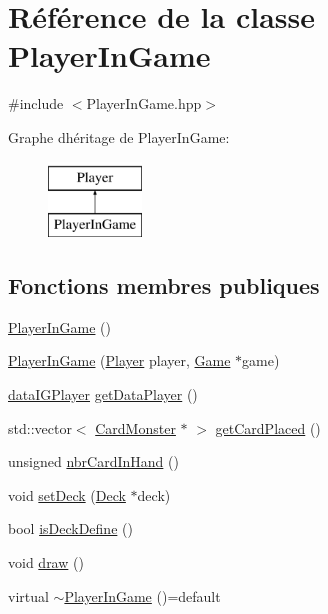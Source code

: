 \hypertarget{classPlayerInGame}{}\section{Référence de la classe Player\+In\+Game}
\label{classPlayerInGame}


{\ttfamily \#include $<$Player\+In\+Game.\+hpp$>$}

Graphe d\textquotesingle{}héritage de Player\+In\+Game\+:\begin{figure}[H]
\begin{center}
\leavevmode
\includegraphics[height=2.000000cm]{classPlayerInGame}
\end{center}
\end{figure}
\subsection*{Fonctions membres publiques}
\begin{DoxyCompactItemize}
\item 
\hyperlink{classPlayerInGame_aef3887730c6e58e3ffa4b8636f5a1fd4}{Player\+In\+Game} ()
\item 
\hyperlink{classPlayerInGame_a64e5c60c2e6106c9dda8c7d79fc36d8b}{Player\+In\+Game} (\hyperlink{classPlayer}{Player} player, \hyperlink{classGame}{Game} $\ast$game)
\item 
\hyperlink{structdataIGPlayer}{data\+I\+G\+Player} \hyperlink{classPlayerInGame_addeeee2e42cf2009fc21511624414146}{get\+Data\+Player} ()
\item 
std\+::vector$<$ \hyperlink{classCardMonster}{Card\+Monster} $\ast$ $>$ \hyperlink{classPlayerInGame_ad97fa91b1e26e88db5b62bc71f233709}{get\+Card\+Placed} ()
\item 
unsigned \hyperlink{classPlayerInGame_a9f8df0a2ef00955f318b41149f57fcb7}{nbr\+Card\+In\+Hand} ()
\item 
void \hyperlink{classPlayerInGame_a399370210526407c4234d19815a5fa44}{set\+Deck} (\hyperlink{classDeck}{Deck} $\ast$deck)
\item 
bool \hyperlink{classPlayerInGame_ae0fe37f43dd1c3d164041fdc4a668a32}{is\+Deck\+Define} ()
\item 
void \hyperlink{classPlayerInGame_a646d88b36595c2754ce33555b867c012}{draw} ()
\item 
virtual \hyperlink{classPlayerInGame_a75256787f26b0d264a929e61889caba1}{$\sim$\+Player\+In\+Game} ()=default
\end{DoxyCompactItemize}
